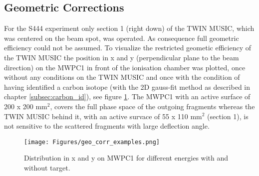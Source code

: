 \subsection{Geometric Corrections}
For the S444 experiment only section 1 (right down) of the TWIN MUSIC, which was centered on the beam spot, was operated. As consequence full geometric efficiency could not be assumed. To visualize the restricted geometic efficiency of the TWIN MUSIC the position in x and y (perpendicular plane to the beam direction) on the MWPC1 in front of the ionisation chamber was plotted, once without any conditions on the TWIN MUSIC and once with the condition of having identified a carbon isotope (with the 2D gauss-fit method as described in chapter \ref{subsec:carbon_id}), see figure \ref{fig:mw1_xy}. The MWPC1 with an active surface of 200 x 200 mm$^{2}$, covers the full phase space of the outgoing fragments whereas the TWIN MUSIC behind it, with an active survace of 55 x 110 mm$^{2}$ (section 1), is not sensitive to the scattered fragments with large deflection angle.\newline
\begin{figure}[htpb]
    \centering
    \texttt{[image: Figures/geo\_corr\_examples.png]}
    \caption{
    Distribution in x and y on MWPC1 for different energies with and without target. 
     }
    \label{fig:mw1_xy}
\end{figure}

